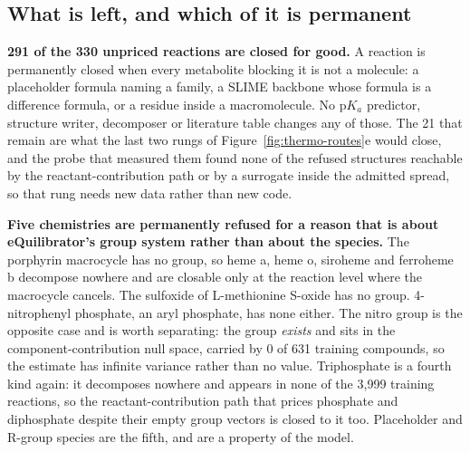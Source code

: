 \subsection{What is left, and which of it is permanent}
\label{sec:permanent}



\textbf{291 of the 330 unpriced reactions are closed for good.} A reaction is permanently
closed when every metabolite blocking it is not a molecule: a placeholder formula naming a
family, a SLIME backbone whose formula is a difference formula, or a residue inside a
macromolecule. No p$K_a$ predictor, structure writer, decomposer or literature table changes
any of those. The 21 that remain are what the last two rungs of
Figure~\ref{fig:thermo-routes}e would close, and the probe that measured them found none of
the refused structures reachable by the reactant-contribution path or by a surrogate inside
the admitted spread, so that rung needs new data rather than new code.

\textbf{Five chemistries are permanently refused for a reason that is about eQuilibrator's
group system rather than about the species.} The porphyrin macrocycle has no group, so heme
a, heme o, siroheme and ferroheme b decompose nowhere and are closable only at the reaction
level where the macrocycle cancels. The sulfoxide of L-methionine S-oxide has no group.
4-nitrophenyl phosphate, an aryl phosphate, has none either. The nitro group is the opposite
case and is worth separating: the group \emph{exists} and sits in the component-contribution
null space, carried by 0 of 631 training compounds, so the estimate has infinite variance
rather than no value. Triphosphate is a fourth kind again: it decomposes nowhere and appears
in none of the 3{,}999 training reactions, so the reactant-contribution path that prices
phosphate and diphosphate despite their empty group vectors is closed to it too. Placeholder
and R-group species are the fifth, and are a property of the model.

